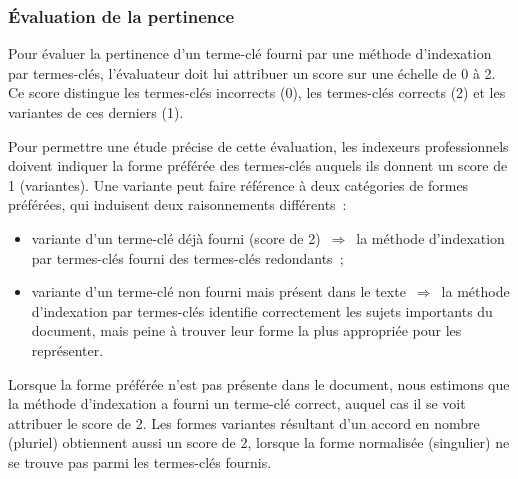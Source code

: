       \subsubsection{Évaluation de la pertinence}
      \label{subsubsec:main-automatic_evaluation_of_keyphrase_annotation-methodology-evaluation_protocol-relevancy}
        Pour évaluer la pertinence d'un terme-clé fourni par une méthode
        d'indexation par termes-clés, l'évaluateur doit lui attribuer un score
        sur une échelle de 0 à 2. Ce score distingue les termes-clés incorrects
        (0), les termes-clés corrects (2) et les variantes de ces derniers (1).

        Pour permettre une étude précise de cette évaluation, les indexeurs
        professionnels doivent indiquer la forme préférée des termes-clés
        auquels ils donnent un score de 1 (variantes). Une variante peut faire
        référence à deux catégories de formes préférées, qui induisent deux
        raisonnements différents~:
        \begin{itemize}
          \item{variante d'un terme-clé déjà fourni (score de
                2)~$\Rightarrow$~la méthode d'indexation par termes-clés fourni
                des termes-clés redondants~;}
          \item{variante d'un terme-clé non fourni mais présent dans le
              texte~$\Rightarrow$~la méthode d'indexation par termes-clés
                identifie correctement les sujets importants du document, mais
                peine à trouver leur forme la plus appropriée pour les
                représenter.}
        \end{itemize}

        Lorsque la forme préférée n'est pas présente dans le document, nous
        estimons que la méthode d'indexation a fourni un terme-clé correct,
        auquel cas il se voit attribuer le score de 2. Les formes variantes
        résultant d'un accord en nombre (pluriel) obtiennent aussi un score de
        2, lorsque la forme normalisée (singulier) ne se trouve pas parmi les
        termes-clés fournis.

